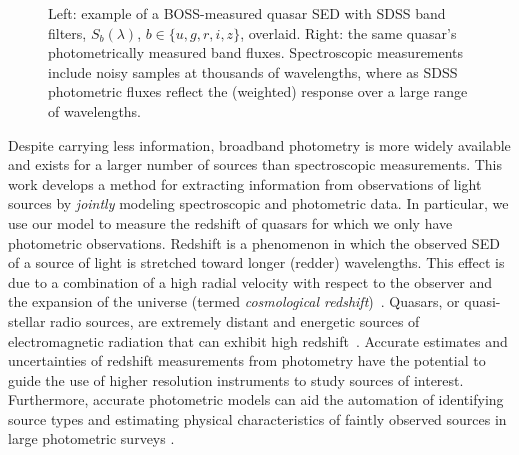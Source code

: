 \documentclass{article}
\begin{document}
\begin{figure}[ht]
\vskip 0in
\begin{center}
\vskip -0.18in
\caption{Left: example of a BOSS-measured quasar SED with SDSS band filters, $S_{b}(\lambda)$, $b \in \{u, g, r, i, z\}$, overlaid.  Right: the same quasar's photometrically measured band fluxes.  Spectroscopic measurements include noisy samples at thousands of wavelengths, where as SDSS photometric fluxes reflect the (weighted) response over a large range of wavelengths.}
\label{fig:filters}
\end{center}
\vskip -0.2in
\end{figure} 

Despite carrying less information, broadband photometry is more widely available and exists for a larger number of sources than spectroscopic measurements. 
This work develops a method for extracting information from observations of light sources by \emph{jointly} modeling spectroscopic and photometric data.  
In particular, we use our model to measure the redshift of quasars for which we only have photometric observations.  
Redshift is a phenomenon in which the observed SED of a source of light is stretched toward longer (redder) wavelengths.
This effect is due to a combination of a high radial velocity with respect to the observer and the expansion of the universe (termed \emph{cosmological redshift})~\cite{hogg1999distance, harrison1993redshift}.  
Quasars, or quasi-stellar radio sources, are extremely distant and energetic sources of electromagnetic radiation that can exhibit high redshift~\cite{silk1997quasars}.  
Accurate estimates and uncertainties of redshift measurements from photometry have the potential to guide the use of higher resolution instruments to study sources of interest.  
Furthermore, accurate photometric models can aid the automation of identifying source types and estimating physical characteristics of faintly observed sources in large photometric surveys \cite{regier2015}.  
\end{document}
